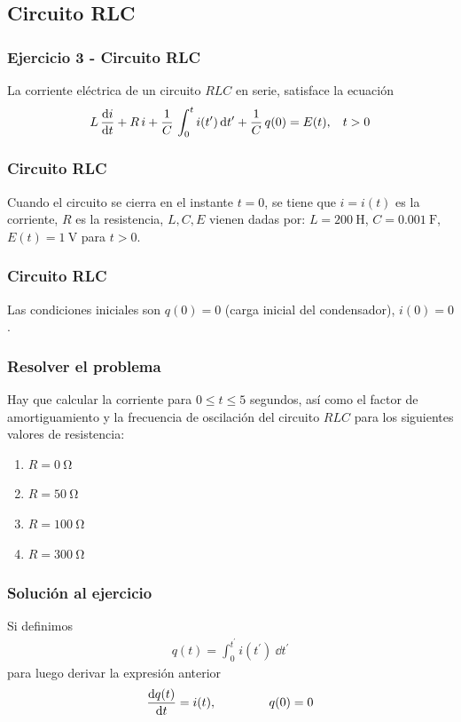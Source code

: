 \subsection{Circuito RLC}
\begin{frame}[plain]
\frametitle{Ejercicio 3 - Circuito RLC}
La corriente eléctrica de un circuito $RLC$ en serie, satisface la ecuación
\fontsize{12}{12}\selectfont
\begin{align}
L \, \dv{i}{t} + R \, i + \dfrac{1}{C} \, \int_{0}^{t} i(t^{\prime}) \dd{t^{\prime}} +\dfrac{1}{C} \, q(0) = E(t), \hspace{0.3cm} t > 0
    \label{eq:ecuacion1}
\end{align}
\begin{figure}[h!]
    \centering
    
\end{figure}
\end{frame}
\begin{frame}
\frametitle{Circuito RLC}
\begin{figure}
    \centering
    
\end{figure}
Cuando el circuito se cierra en el instante $t = 0$, se tiene que $i = i(t)$ es la corriente, $R$ es la resistencia, $L, C, E$ vienen dadas por: $L = \SI{200}{\henry}$, $C = \SI{0.001}{\farad}$, $E(t) = \SI{1}{\volt}$ para $t > 0$.
\end{frame}
\begin{frame}
\frametitle{Circuito RLC}
\begin{figure}
    \centering
    
\end{figure}
Las condiciones iniciales son $q(0) = 0$ (carga inicial del condensador), $i(0) = 0$. 
\end{frame}
\begin{frame}
\frametitle{Resolver el problema}
Hay que calcular la corriente para $0 \leq t \leq 5$ segundos, así como el factor de amortiguamiento y la frecuencia de oscilación del circuito $RLC$ para los siguientes valores de resistencia:
\begin{enumerate}
\item $R = \SI{0}{\ohm}$
\item $R = \SI{50}{\ohm}$
\item $R = \SI{100}{\ohm}$
\item $R = \SI{300}{\ohm}$
\end{enumerate}
\end{frame}
\begin{frame}
\frametitle{Solución al ejercicio}
Si definimos
\begin{align}
q(t) = \int_{0}^{t^{\prime}} i(t^{\prime}) \: \dd{t^{\prime}}
\label{eq:ecuacion2}
\end{align}
para luego derivar la expresión anterior
\begin{align}
\dv{q(t)}{t} = i(t), \hspace{1.5cm} q(0)=0
\label{eq:ecuacion3}
\end{align}
\end{frame}
